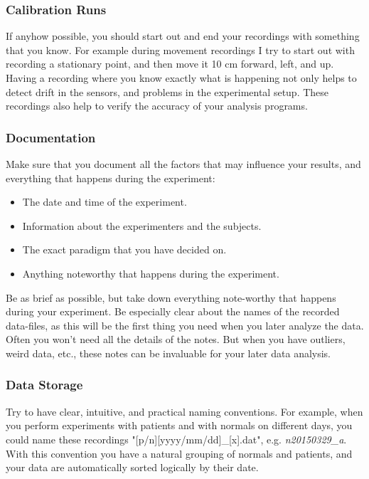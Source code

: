 \subsubsection{Calibration Runs}
If anyhow possible, you should start out and end your recordings with something that you know. For example during movement recordings I try to start out with recording a stationary point, and then move it 10 cm forward, left, and up. Having a recording where you know exactly what is happening not only helps to detect drift in the sensors, and problems in the experimental setup. These recordings also help to verify the accuracy of your analysis programs.

\subsubsection{Documentation} 
Make sure that you document all the factors that may influence your results, and everything that happens during the experiment:

\begin{itemize}
  \item The date and time of the experiment.
  \item Information about the experimenters and the subjects.
  \item The exact paradigm that you have decided on.
  \item Anything noteworthy that happens during the experiment.
\end{itemize}

Be as brief as possible, but take down everything note-worthy that happens during your experiment. Be especially clear about the names of the recorded data-files, as this will be the first thing you need when you later analyze the data.
Often you won't need all the details of the notes. But when you have outliers, weird data, etc., these notes can be invaluable for your later data analysis.

\subsubsection{Data Storage}
Try to have clear, intuitive, and practical naming conventions. For example, when you perform experiments with patients and with normals on different days, you could name these recordings "[p/n][yyyy/mm/dd]\_[x].dat", e.g. \emph{n20150329\_a}. With this convention you have a natural grouping of normals and patients, and your data are automatically sorted logically by their date.

